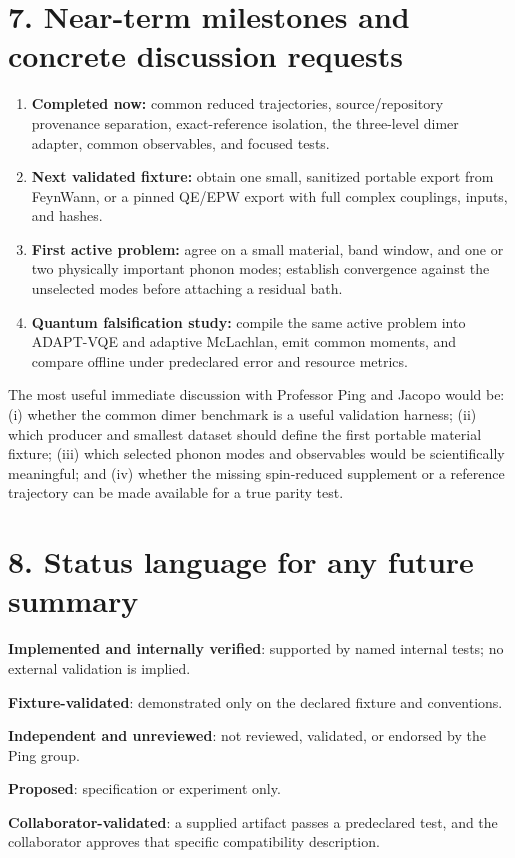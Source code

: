 \documentclass[11pt]{article}
\newcommand{\implemented}{\textcolor{statusgreen}{\textbf{Implemented and internally verified}}}
\newcommand{\fixturevalidated}{\textcolor{statusamber}{\textbf{Fixture-validated}}}
\newcommand{\proposed}{\textcolor{programblue}{\textbf{Proposed}}}
\newcommand{\independent}{\textcolor{statusamber}{\textbf{Independent and unreviewed}}}
\begin{document}
\section*{7. Near-term milestones and concrete discussion requests}

\begin{enumerate}
  \item \textbf{Completed now:} common reduced trajectories, source/repository
  provenance separation, exact-reference isolation, the three-level dimer
  adapter, common observables, and focused tests.
  \item \textbf{Next validated fixture:} obtain one small, sanitized portable
  export from FeynWann, or a pinned QE/EPW export with full complex couplings,
  inputs, and hashes.
  \item \textbf{First active problem:} agree on a small material, band window,
  and one or two physically important phonon modes; establish convergence
  against the unselected modes before attaching a residual bath.
  \item \textbf{Quantum falsification study:} compile the same active problem
  into ADAPT-VQE and adaptive McLachlan, emit common moments, and compare
  offline under predeclared error and resource metrics.
\end{enumerate}

The most useful immediate discussion with Professor Ping and Jacopo would be:
(i) whether the common dimer benchmark is a useful validation harness;
(ii) which producer and smallest dataset should define the first portable
material fixture; (iii) which selected phonon modes and observables would be
scientifically meaningful; and (iv) whether the missing spin-reduced
supplement or a reference trajectory can be made available for a true parity
test.

\section*{8. Status language for any future summary}

\begingroup
\small
\setlength{\parskip}{2pt}
\implemented: supported by named internal tests; no external validation is
implied.\par
\fixturevalidated: demonstrated only on the declared fixture and conventions.\par
\independent: not reviewed, validated, or endorsed by the Ping group.\par
\proposed: specification or experiment only.\par
\textbf{Collaborator-validated}: a supplied artifact passes a predeclared test,
and the collaborator approves that specific compatibility description.
\endgroup
\end{document}
